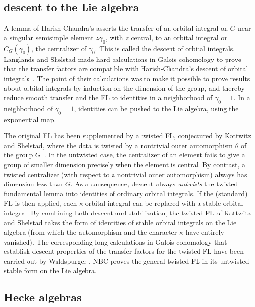 \documentclass[brochure,english,12pt]{bourbaki}
\begin{document}

\subsection{descent to the Lie algebra}\label{sec:descent}

A lemma of Harish-Chandra's asserts the transfer of an orbital
integral on $G$ near a singular semisimple element $z\gamma_0$, with
$z$ central, to an orbital integral on $C_G(\gamma_0)$, the
centralizer of $\gamma_0$.  This is called the descent of orbital
integrals.  Langlands and Shelstad made hard calculations in
Galois cohomology to prove that the transfer factors are compatible
with Harish-Chandra's descent of orbital integrals~\cite{LS:1990}.  The point of
their calculations was to make it possible to prove results about
orbital integrals by induction on the dimension of the group, and
thereby reduce smooth transfer and the FL to identities
in a neighborhood of $\gamma_0=1$.  In a neighborhood of $\gamma_0=1$,
identities can be pushed to the Lie algebra, using the exponential map.

The original FL has been supplemented by a twisted
FL, conjectured by Kottwitz and Shelstad, where the
data is twisted by a nontrivial outer automorphism $\theta$ of the
group $G$~\cite{KS:1999}.  In the untwisted case, the centralizer of an element fails
to give a group of smaller dimension precisely when the element is
central.  By contrast, a twisted centralizer (with respect to a
nontrivial outer automorphism) always has dimension less than $G$.  As
a consequence, descent always {\it untwists} the twisted fundamental
lemma into identities of ordinary orbital integrals.  If the
(standard) FL is then applied, each $\kappa$-orbital
integral can be replaced with a stable orbital integral.  By combining both
descent and stabilization, the twisted FL of Kottwitz and Shelstad
takes the form of identities of stable orbital integrals on the Lie
algebra (from which the automorphism and the character $\kappa$ have
entirely vanished).  The corresponding long calculations in Galois
cohomology that establish descent properties of the transfer factors
for the twisted FL have been carried out by
Waldspurger \cite{Wald:2008}.  NBC proves the general twisted FL in
its untwisted stable form on the Lie algebra.



\subsection{Hecke algebras}
\end{document}
